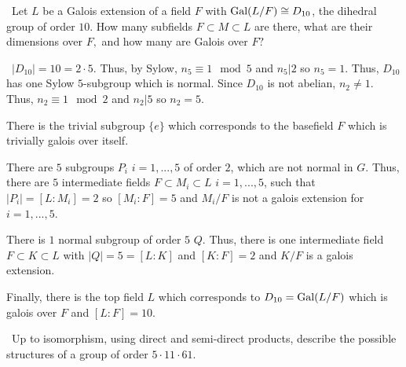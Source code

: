 \documentclass[12pt]{AlgebraQual}
\begin{document}
\begin{problem} $\,$
Let $L$ be a Galois extension of a field $F$ with $\text{Gal}(L/F)\cong D_{10}$, the dihedral group of order $10$. How many subfields $F\subset M\subset L$ are there, what are their dimensions over $F,$ and how many are Galois over $F?$
\end{problem}


\begin{solution}$\,$
$|D_{10}|=10=2\cdot 5$. Thus, by Sylow, $n_5\equiv 1\mod 5$ and $n_5|2$ so $n_5=1$. Thus, $D_{10}$ has one Sylow $5$-subgroup which is normal. Since $D_{10}$ is not abelian, $n_2\not=1$. Thus, $n_2\equiv 1\mod 2$ and $n_2|5$ so $n_2=5$.

There is the trivial subgroup $\{e\}$ which corresponds to the basefield $F$ which is trivially galois over itself.

There are $5$ subgroups $P_i$ $i=1,...,5$ of order $2$, which are not normal in $G$. Thus, there are $5$ intermediate fields $F\subset M_i\subset L$ $i=1,...,5$, such that $|P_i|=[L:M_i]=2$ so $[M_i:F]=5$ and $M_i/F$ is not a galois extension for $i=1,...,5$.

There is $1$ normal subgroup of order $5$ $Q$. Thus, there is one intermediate field $F\subset K\subset L$ with $|Q|=5=[L:K]$ and $[K:F]=2$ and $K/F$ is a galois extension.

Finally, there is the top field $L$ which corresponds to $D_{10}=\text{Gal}(L/F)$ which is galois over $F$ and $[L:F]=10$.
\end{solution}
\newpage


\begin{problem} $\,$
Up to isomorphism, using direct and semi-direct products, describe the possible structures of a group of order $5\cdot 11\cdot 61$.
\end{problem}
\end{document}
